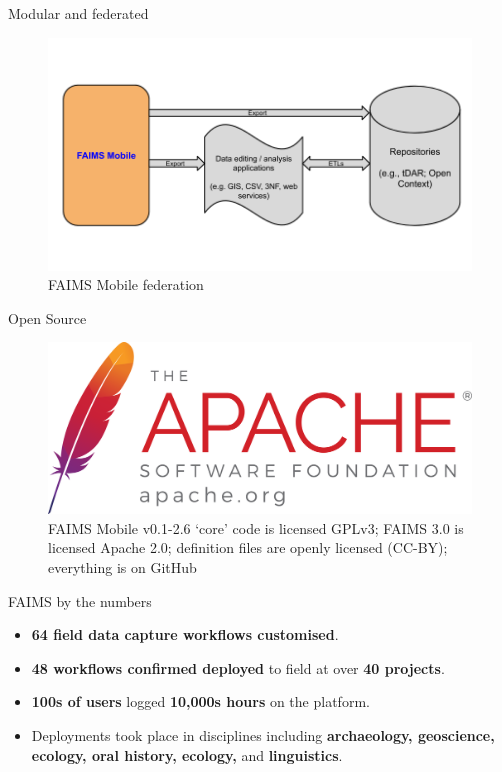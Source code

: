 \documentclass[aspectratio=169, 12pt]{beamer} %
\begin{document}
\begin{frame}{Modular and federated}
 \begin{figure}[H]
    \centering
        \includegraphics[height=.75\textheight]{figures/FAIMS-federation}
        \caption{FAIMS Mobile federation}
        \label{fig:FAIMS-federation}
 \end{figure}
\end{frame}

\begin{frame}{Open Source}
 \begin{figure}[H]
    \centering
        \includegraphics[width=.75\textwidth]{figures/asf_logo_url.png}
        \caption{FAIMS Mobile v0.1-2.6 `core' code is licensed GPLv3; FAIMS 3.0 is licensed Apache 2.0; definition files are openly licensed (CC-BY); everything is on GitHub}
        \label{fig:FAIMS-github-OSS}
 \end{figure}
\end{frame}


\begin{frame}{FAIMS by the numbers}
 \begin{itemize}[label=\textbullet]
        \item \textbf{64 field data capture workflows customised}.
        \item \textbf{48 workflows confirmed deployed} to field at over \textbf{40 projects}.
        \item \textbf{100s of users} logged \textbf{10,000s hours} on the platform.
        \item Deployments took place in disciplines including \textbf{archaeology, geoscience, ecology, oral history, ecology, }and \textbf{linguistics}.
    \end{itemize}
\end{frame}
\end{document}
